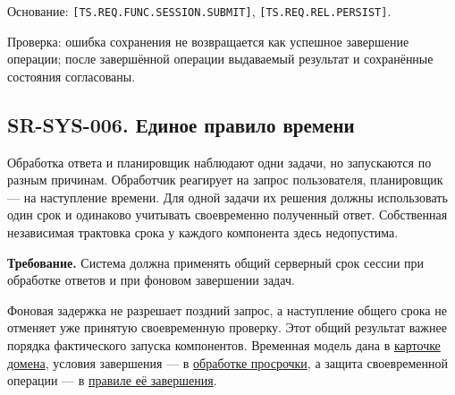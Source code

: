 \documentclass[12pt,a4paper]{article}
\begin{document}
Основание: \texttt{[TS.\allowbreak{}REQ.\allowbreak{}FUNC.\allowbreak{}SESSION.\allowbreak{}SUBMIT]}, \texttt{[TS.\allowbreak{}REQ.\allowbreak{}REL.\allowbreak{}PERSIST]}.

Проверка: ошибка сохранения не возвращается как успешное завершение операции; после завершённой операции выдаваемый результат и сохранённые состояния согласованы.

\subsection{SR-SYS-006. Единое правило времени}\label{sr-sys-006-ux435ux434ux438ux43dux43eux435-ux43fux440ux430ux432ux438ux43bux43e-ux432ux440ux435ux43cux435ux43dux438}

\hypertarget{sr-sys-006-единое-правило-времени}{}

Обработка ответа и планировщик наблюдают одни задачи, но запускаются по разным причинам. Обработчик реагирует на запрос пользователя, планировщик --- на наступление времени. Для одной задачи их решения должны использовать один срок и одинаково учитывать своевременно полученный ответ. Собственная независимая трактовка срока у каждого компонента здесь недопустима.

\textbf{Требование.} Система должна применять общий серверный срок сессии при обработке ответов и при фоновом завершении задач.

Фоновая задержка не разрешает поздний запрос, а наступление общего срока не отменяет уже принятую своевременную проверку. Этот общий результат важнее порядка фактического запуска компонентов. Временная модель дана в \href{../notes/domains/\%D0\%A1\%D0\%B5\%D1\%81\%D1\%81\%D0\%B8\%D0\%B8_\%D0\%B7\%D0\%B0\%D0\%B4\%D0\%B0\%D1\%87.pdf\#nameddest=\%D1\%81\%D1\%80\%D0\%BE\%D0\%BA-\%D0\%B8-\%D0\%BF\%D0\%BE\%D0\%BF\%D1\%8B\%D1\%82\%D0\%BA\%D0\%B0}{карточке домена}, условия завершения --- в \href{../07_\%D0\%9F\%D1\%80\%D0\%BE\%D0\%B3\%D1\%80\%D0\%B0\%D0\%BC\%D0\%BC\%D0\%BD\%D1\%8B\%D0\%B5_\%D1\%82\%D1\%80\%D0\%B5\%D0\%B1\%D0\%BE\%D0\%B2\%D0\%B0\%D0\%BD\%D0\%B8\%D1\%8F/DOC-06.2_\%D0\%A1\%D0\%B5\%D1\%81\%D1\%81\%D0\%B8\%D0\%B8_\%D0\%B7\%D0\%B0\%D0\%B4\%D0\%B0\%D1\%87_\%D0\%B8_\%D0\%BF\%D0\%BB\%D0\%B0\%D0\%BD\%D0\%B8\%D1\%80\%D0\%BE\%D0\%B2\%D1\%89\%D0\%B8\%D0\%BA.pdf\#nameddest=swr-ses-017-\%D0\%B7\%D0\%B0\%D0\%B2\%D0\%B5\%D1\%80\%D1\%88\%D0\%B5\%D0\%BD\%D0\%B8\%D0\%B5-\%D0\%BF\%D0\%BE-\%D0\%BF\%D1\%80\%D0\%BE\%D1\%81\%D1\%80\%D0\%BE\%D1\%87\%D0\%BA\%D0\%B5}{обработке просрочки}, а защита своевременной операции --- в \href{../07_\%D0\%9F\%D1\%80\%D0\%BE\%D0\%B3\%D1\%80\%D0\%B0\%D0\%BC\%D0\%BC\%D0\%BD\%D1\%8B\%D0\%B5_\%D1\%82\%D1\%80\%D0\%B5\%D0\%B1\%D0\%BE\%D0\%B2\%D0\%B0\%D0\%BD\%D0\%B8\%D1\%8F/DOC-06.2_\%D0\%A1\%D0\%B5\%D1\%81\%D1\%81\%D0\%B8\%D0\%B8_\%D0\%B7\%D0\%B0\%D0\%B4\%D0\%B0\%D1\%87_\%D0\%B8_\%D0\%BF\%D0\%BB\%D0\%B0\%D0\%BD\%D0\%B8\%D1\%80\%D0\%BE\%D0\%B2\%D1\%89\%D0\%B8\%D0\%BA.pdf\#nameddest=swr-ses-015-\%D0\%B7\%D0\%B0\%D0\%B2\%D0\%B5\%D1\%80\%D1\%88\%D0\%B5\%D0\%BD\%D0\%B8\%D0\%B5-\%D1\%81\%D0\%B2\%D0\%BE\%D0\%B5\%D0\%B2\%D1\%80\%D0\%B5\%D0\%BC\%D0\%B5\%D0\%BD\%D0\%BD\%D0\%BE\%D0\%B9-\%D0\%BF\%D1\%80\%D0\%BE\%D0\%B2\%D0\%B5\%D1\%80\%D0\%BA\%D0\%B8}{правиле её завершения}.
\end{document}
